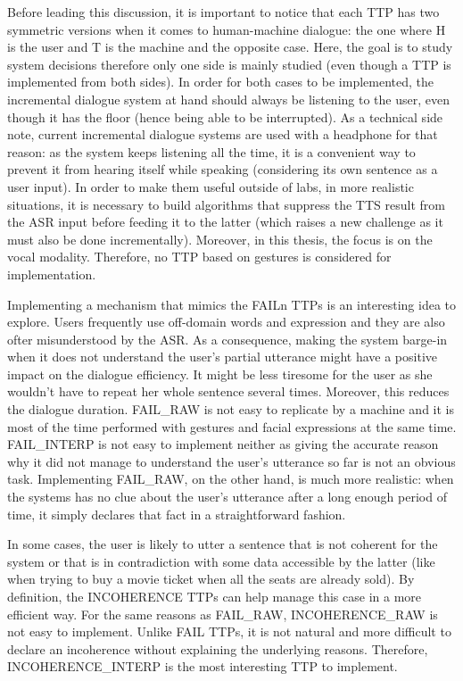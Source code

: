 				Before leading this discussion, it is important to notice that each TTP has two symmetric versions when it comes to human-machine dialogue: the one where H is the user and T is the machine and the opposite case. Here, the goal is to study system decisions therefore only one side is mainly studied (even though a TTP is implemented from both sides). In order for both cases to be implemented, the incremental dialogue system at hand should always be listening to the user, even though it has the floor (hence being able to be interrupted). As a technical side note, current incremental dialogue systems are used with a headphone for that reason: as the system keeps listening all the time, it is a convenient way to prevent it from hearing itself while speaking (considering its own sentence as a user input). In order to make them useful outside of labs, in more realistic situations, it is necessary to build algorithms that suppress the TTS result from the ASR input before feeding it to the latter (which raises a new challenge as it must also be done incrementally). Moreover, in this thesis, the focus is on the vocal modality. Therefore, no TTP based on gestures is considered for implementation.

				Implementing a mechanism that mimics the FAILn TTPs is an interesting idea to explore. Users frequently use off-domain words and expression \cite{Ghigi2014} and they are also ofter misunderstood by the ASR. As a consequence, making the system barge-in when it does not understand the user's partial utterance might have a positive impact on the dialogue efficiency. It might be less tiresome for the user as she wouldn't have to repeat her whole sentence several times. Moreover, this reduces the dialogue duration. FAIL\_RAW is not easy to replicate by a machine and it is most of the time performed with gestures and facial expressions at the same time. FAIL\_INTERP is not easy to implement neither as giving the accurate reason why it did not manage to understand the user's utterance so far is not an obvious task. Implementing FAIL\_RAW, on the other hand, is much more realistic: when the systems has no clue about the user's utterance after a long enough period of time, it simply declares that fact in a straightforward fashion.

				In some cases, the user is likely to utter a sentence that is not coherent for the system or that is in contradiction with some data accessible by the latter (like when trying to buy a movie ticket when all the seats are already sold). By definition, the INCOHERENCE TTPs can help manage this case in a more efficient way. For the same reasons as FAIL\_RAW, INCOHERENCE\_RAW is not easy to implement. Unlike FAIL TTPs, it is not natural and more difficult to declare an incoherence without explaining the underlying reasons. Therefore, INCOHERENCE\_INTERP is the most interesting TTP to implement.

